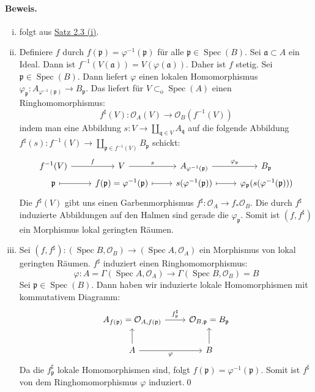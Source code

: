 \paragraph{Beweis.} \begin{enumerate}[(i)]
\item folgt aus \hyperref[2.3]{Satz 2.3 (i)}.
\item Definiere $f$ durch $f(\mathfrak{p})=\varphi^{-1}(\mathfrak{p})$ für alle $\mathfrak{p}\in\operatorname{Spec}(B)$. Sei $\mathfrak{a}\subset A$ ein Ideal. Dann ist $f^{-1}(V(\mathfrak{a}))=V(\varphi(\mathfrak{a}))$. Daher ist $f$ stetig. Sei $\mathfrak{p}\in\operatorname{Spec}(B)$. Dann liefert $\varphi$ einen lokalen Homomorphismus $\varphi_\mathfrak{p}:A_{\varphi^{-1}(\mathfrak{p})}\to B_\mathfrak{p}$. Das liefert für $V\subset_\text{o}\operatorname{Spec}(A)$ einen Ringhomomorphismus:
\[f^\sharp(V):\mathcal{O}_A(V)\to\mathcal{O}_B(f^{-1}(V)) \]
indem man eine Abbildung $s:V\to\coprod_{\mathfrak{q}\in V} A_\mathfrak{q}$ auf die folgende Abbildung $f^\sharp(s): f^{-1}(V)\to\coprod_{\mathfrak{p}\in f^{-1}(V)}B_\mathfrak{p}$ schickt:
\[ \begin{tikzcd}[row sep=.1em]
f^{-1}(V) \ar[r, "f"] & V\ar[r, "s"] & A_{\varphi^{-1}(\mathfrak{p})}\ar[r, "\varphi_\mathfrak{p}"] & B_\mathfrak{p}\\
\mathfrak{p}\ar[r, mapsto] & f(\mathfrak{p}) = \varphi^{-1}(\mathfrak{p})\ar[r, mapsto] & s(\varphi^{-1}(\mathfrak{p}))\ar[r, mapsto] & \varphi_\mathfrak{p}(s(\varphi^{-1}(\mathfrak{p})))
\end{tikzcd} \]
Die $f^\sharp(V)$ gibt uns einen Garbenmorphismus $f^\sharp:\mathcal{O}_A\to f_\ast \mathcal{O}_B$. Die durch $f^\sharp$ induzierte Abbildungen auf den Halmen sind gerade die $\varphi_\mathfrak{p}$. Somit ist $(f,f^\sharp)$ ein Morphismus lokal geringten Räumen.
\item Sei $(f,f^\sharp):(\operatorname{Spec}B,\mathcal{O}_B)\to(\operatorname{Spec}A,\mathcal{O}_A)$ ein Morphismus von lokal geringten Räu\-men. $f^\sharp$ induziert einen Ringhomomorphismus:
\[\varphi: A=\Gamma(\operatorname{Spec}A,\mathcal{O}_A)\to\Gamma(\operatorname{Spec}B,\mathcal{O}_B) =B \]
Sei $\mathfrak{p}\in\operatorname{Spec}(B)$. Dann haben wir induzierte lokale Homomorphismen mit kommutativem Diagramm:
\[\begin{tikzcd}
A_{f(\mathfrak{p})} = \mathcal{O}_{A,f(\mathfrak{p})}  \ar[r, "f^\sharp_\mathfrak{p}"] & \mathcal{O}_{B,\mathfrak{p}} = B_\mathfrak{p}\\
A \ar[r, "\varphi"']\ar[u] & B\ar[u]
\end{tikzcd} \]
Da die $f^\sharp_\mathfrak{p}$ lokale Homomorphismen sind, folgt $f(\mathfrak{p})=\varphi^{-1}(\mathfrak{p})$. Somit ist $f^\sharp$ von dem Ringhomomorphismus $\varphi$ induziert.\qed
\end{enumerate}

